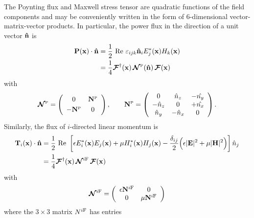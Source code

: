 \documentclass[letterpaper]{article}
\newcommand{\IF}{^{i\text{\scriptsize F}}}
\begin{document}
The Poynting flux and Maxwell stress tensor are quadratic functions
of the field components and may be conveniently written in the form
of 6-dimensional vector-matrix-vector products. 
In particular, the power flux in the direction of a unit vector 
$\mathbf{\hat n}$ is
\begin{align}
 \mathbf{P}(\mathbf{x}) \cdot \mathbf{\hat n}
   &=\frac{1}{2}\text{ Re }\varepsilon_{ijk}\mathbf{\hat n}_i E^*_j(\mathbf{x}) H_k(\mathbf{x})
\nonumber \\
   &=\frac{1}{4}\boldsymbol{\mathcal{F}}^\dagger(\mathbf{x}) \, \boldsymbol{\mathcal{N}}^{\hbox{\tiny{P}}}(\mathbf{\hat n}) \, \boldsymbol{\mathcal{F}}(\mathbf{x})
\label{PVMVP}
\end{align}
with
$$
   \boldsymbol{\mathcal{N}}^{\hbox{\tiny{P}}}=
   \left(\begin{array}{cc}
   0       & \mathbf{N}^{\hbox{\tiny{P}}}   \\ [3pt]
  -\mathbf{N}^{\hbox{\tiny{P}}} & 0
   \end{array}\right), 
\qquad 
   \mathbf{N}^{\hbox{\tiny{P}}}
   =
   \left(\begin{array}{ccc}
   0          &  \hat{n}_z & -\hat{n_y} \\
  -\hat{n}_z  &  0         & +\hat{n_x} \\
   \hat{n}_y  & -\hat{n}_x & 0
   \end{array}\right).
$$
Similarly, the flux of $i$-directed linear momentum is
\begin{align}
 \vb T_{i}(\vb x) \cdot \vbhat{n} 
&=\frac{1}{2}\text{ Re }
  \left[ \epsilon E^*_i(\vb x) E_j(\vb x) 
             +\mu H^*_i(\vb x) H_j(\vb x) 
       -\frac{\delta_{ij}}{2}
         \Big( \epsilon |\vb E|^2
              +\mu      |\vb H|^2
         \Big)
 \right] \hat {n}_j
\nn
&= \frac{1}{4}\bmc{F}^\dagger(\vb x) 
   \, \bmc{N}\IF \, \bmc{F}(\vb x)
\label{IFVMVP}
\end{align}
with
$$
   \bmc N\IF=
   \left(\begin{array}{cc}
   \epsilon \vb N\IF & 0 \\
            0        & \mu \vb N\IF 
   \end{array}\right)
$$
where the $3\times 3$ matrix $N\IF$ has entries
\end{document}
